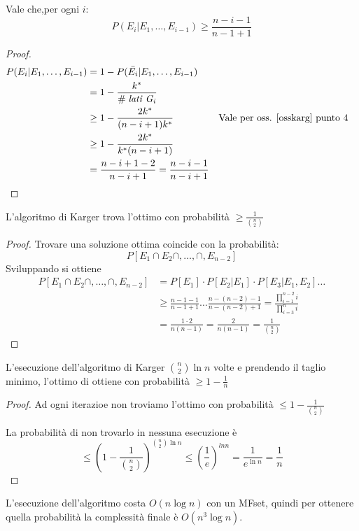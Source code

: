 \begin{lemma}
    Vale che,per ogni $i$: $$P(E_i | E_1, \dots, E_{i-1}) \geq \frac{n-i-1}{n-1+1}$$
\end{lemma}
\begin{proof}
    \begin{equation}
        \begin{aligned}
            P(E_i | E_1, \dots, E_{i-1}) &= 1- P(\bar{E_i} | E_1, \dots, E_{i-1})\\
            &= 1 - \frac{k^*}{\mathit{\#\;lati\;G_i}}\\
            &\geq 1 - \frac{2k^*}{(n-i+1)k^*} && \text{Vale per oss. \ref{osskarg} punto 4}\\
            &\geq 1 - \frac{2k^*}{k^*(n-i+1)} \\
            &= \frac{n-i+1-2}{n-i+1} = \frac{n-i-1}{n-i+1}
        \end{aligned}
    \end{equation}
\end{proof}
\begin{theorem}
    L'algoritmo di Karger trova l'ottimo con probabilità $\geq \frac{1}{\binom{n}{2}}$
\end{theorem}
\begin{proof}
    Trovare una soluzione ottima coincide con la probabilità:
    $$P[E_1 \cap E_2 \cap, \dots, \cap, E_{n-2}]$$
    Sviluppando si ottiene 
    \begin{equation}
        \begin{aligned}
            P[E_1 \cap E_2 \cap, \dots, \cap, E_{n-2}] &= P[E_1]\cdot P[E_2 | E_1]\cdot P[E_3 | E_1,E_2] \dots\\
            &\geq \frac{n-1-1}{n-1+1} \dots \frac{n - (n-2)-1}{n - (n-2)+1} = \frac{\prod_{i=1}^{n-2}i}{\prod_{i=3}^{n}i}\\
            &= \frac{1 \cdot 2}{n(n-1)} = \frac{2}{n(n-1)} = \frac{1}{\binom{n}{2}}
        \end{aligned}
    \end{equation}

\end{proof}
\begin{corollary}
    L'esecuzione dell'algoritmo di Karger $\binom{n}{2}\ln n$ volte e prendendo il taglio minimo, 
    l'ottimo di ottiene con probabilità $\geq 1 - \frac{1}{n}$
\end{corollary}
\begin{proof}
    Ad ogni iterazioe non troviamo l'ottimo con probabilità $\leq 1 - \frac{1}{\binom{n}{2}}$

    La probabilità di non trovarlo in nessuna esecuzione è 
    $$\leq (1 - \frac{1}{\binom{n}{2}}) ^{\binom{n}{2}\ln n} \leq (\frac{1}{e})^{ln n} = \frac{1}{e ^{\ln n}} = \frac{1}{n}$$
\end{proof}
\begin{remark}
    L'esecuzione dell'algoritmo costa $O(n\log n)$ con un MFset, quindi per ottenere quella probabilità 
    la complessità finale è $O(n^3 \log n)$.
\end{remark}

